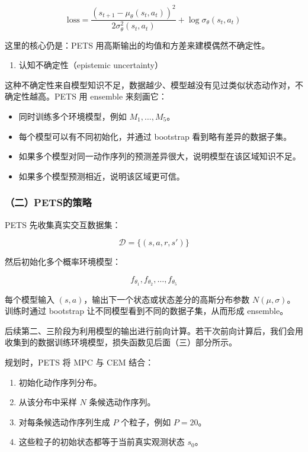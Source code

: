 \[
\mathrm{loss}
=\frac{(s_{t+1}-\mu_\theta(s_t,a_t))^2}{2\sigma_\theta^2(s_t,a_t)}
+\log\sigma_\theta(s_t,a_t)
\]

这里的核心仍是：PETS 用高斯输出的均值和方差来建模偶然不确定性。

\begin{enumerate}
\def\labelenumi{\arabic{enumi}.}
\setcounter{enumi}{1}
\tightlist
\item
  认知不确定性（epistemic uncertainty）
\end{enumerate}

这种不确定性来自模型知识不足，数据越少、模型越没有见过类似状态动作对，不确定性越高。PETS 用 ensemble 来刻画它：

\begin{itemize}
\tightlist
\item
  同时训练多个环境模型，例如 \(M_1,\ldots,M_5\)。
\item
  每个模型可以有不同初始化，并通过 bootstrap 看到略有差异的数据子集。
\item
  如果多个模型对同一动作序列的预测差异很大，说明模型在该区域知识不足。
\item
  如果多个模型预测相近，说明该区域更可信。
\end{itemize}

\hypertarget{ux4e8cpetsux7684ux7b56ux7565}{%
\subsubsection{（二）PETS的策略}\label{ux4e8cpetsux7684ux7b56ux7565}}

PETS 先收集真实交互数据集：

\[
\mathcal D=\{(s,a,r,s')\}
\]

然后初始化多个概率环境模型：

\[
f_{\theta_1},f_{\theta_2},\ldots,f_{\theta_5}
\]

每个模型输入 \((s,a)\)，输出下一个状态或状态差分的高斯分布参数 \(N(\mu,\sigma)\)。训练时通过 bootstrap 让不同模型看到不同的数据子集，从而形成 ensemble。

后续第二、三阶段为利用模型的输出进行前向计算。若干次前向计算后，我们会用收集到的数据训练环境模型，损失函数见后面（三）部分所示。

规划时，PETS 将 MPC 与 CEM 结合：

\begin{enumerate}
\def\labelenumi{\arabic{enumi}.}
\tightlist
\item
  初始化动作序列分布。
\item
  从该分布中采样 \(N\) 条候选动作序列。
\item
  对每条候选动作序列生成 \(P\) 个粒子，例如 \(P=20\)。
\item
  这些粒子的初始状态都等于当前真实观测状态 \(s_0\)。
\end{enumerate}

